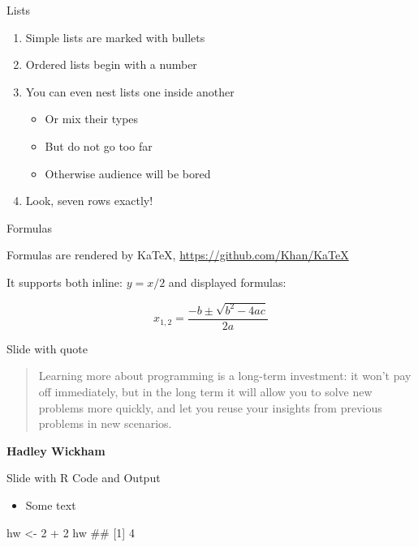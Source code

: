 \documentclass[ignorenonframetext,]{beamer}
\newenvironment{Shaded}{}{}
\newcommand{\CommentTok}[1]{\textcolor[rgb]{0.00,0.50,0.00}{#1}}
\newcommand{\DecValTok}[1]{#1}
\newcommand{\NormalTok}[1]{#1}
\newcommand{\OperatorTok}[1]{#1}
\newcommand{\StringTok}[1]{\textcolor[rgb]{0.00,0.50,0.50}{#1}}
\providecommand{\tightlist}{%
  \setlength{\itemsep}{0pt}\setlength{\parskip}{0pt}}
\begin{document}
\begin{frame}{Lists}
\protect\hypertarget{lists}{}

\begin{enumerate}
\tightlist
\item
  Simple lists are marked with bullets
\item
  Ordered lists begin with a number
\item
  You can even nest lists one inside another

  \begin{itemize}
  \tightlist
  \item
    Or mix their types
  \item
    But do not go too far
  \item
    Otherwise audience will be bored
  \end{itemize}
\item
  Look, seven rows exactly!
\end{enumerate}

\end{frame}

\begin{frame}{Formulas}
\protect\hypertarget{formulas}{}

Formulas are rendered by KaTeX, \url{https://github.com/Khan/KaTeX}

It supports both inline: \(y = x / 2\) and displayed formulas:

\[ x_{1,2} = \frac{- b \pm \sqrt{b^2 - 4ac}}{2a} \]

\end{frame}

\begin{frame}{Slide with quote}
\protect\hypertarget{slide-with-quote}{}

\begin{quote}
Learning more about programming is a long-term investment: it won't pay
off immediately, but in the long term it will allow you to solve new
problems more quickly, and let you reuse your insights from previous
problems in new scenarios.
\end{quote}

\textbf{Hadley Wickham}

\end{frame}

\begin{frame}[fragile]{Slide with R Code and Output}
\protect\hypertarget{slide-with-r-code-and-output}{}

\begin{itemize}
\tightlist
\item
  Some text \scriptsize
\end{itemize}

\begin{Shaded}
\begin{Highlighting}[]
\NormalTok{hw <-}\StringTok{ }\DecValTok{2} \OperatorTok{+}\StringTok{ }\DecValTok{2}
\NormalTok{hw}
\CommentTok{## [1] 4}
\end{Highlighting}
\end{Shaded}

\end{frame}
\end{document}
